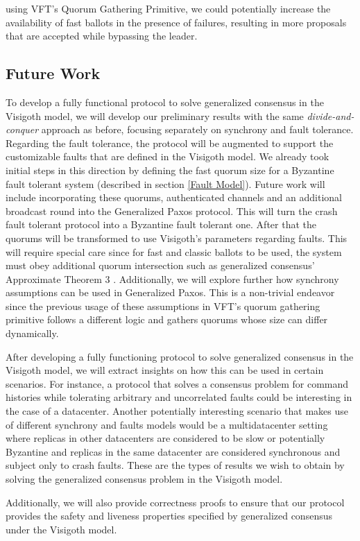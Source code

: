 \documentclass[runningheads,a4paper]{llncs}
\begin{document}
using VFT's Quorum Gathering Primitive, we could potentially increase the availability of fast ballots in the presence of failures, resulting in more proposals that are accepted while bypassing the leader. \par

\subsection{Future Work} \label{Future Work}

To develop a fully functional protocol to solve generalized consensus in the Visigoth model, we will develop our preliminary results with the same \textit{divide-and-conquer} approach as before, focusing separately on synchrony and fault tolerance. Regarding the fault tolerance, the protocol will be augmented to support the customizable faults that are defined in the Visigoth model. We already took initial steps in this direction by defining the fast quorum size for a Byzantine fault tolerant system (described in section \ref{Fault Model}). Future work will include incorporating these quorums, authenticated channels and an additional broadcast round into the Generalized Paxos protocol. This will turn the crash fault tolerant protocol into a Byzantine fault tolerant one. After that the quorums will be transformed to use Visigoth's parameters regarding faults. This will require special care since for fast and classic ballots to be used, the system must obey additional quorum intersection such as generalized consensus' Approximate Theorem 3 \cite{Lamport2005}. Additionally, we will explore further how synchrony assumptions can be used in Generalized Paxos. This is a non-trivial endeavor since the previous usage of these assumptions in VFT's quorum gathering primitive follows a different logic and gathers quorums whose size can differ dynamically. \par
After developing a fully functioning protocol to solve generalized consensus in the Visigoth model, we will extract insights on how this can be used in certain scenarios. For instance, a protocol that solves a consensus problem for command histories while tolerating arbitrary and uncorrelated faults could be interesting in the case of a datacenter. Another potentially interesting scenario that makes use of different synchrony and faults models would be a multidatacenter setting where replicas in other datacenters are considered to be slow or potentially Byzantine and replicas in the same datacenter are considered synchronous and subject only to crash faults. These are the types of results we wish to obtain by solving the generalized consensus problem in the Visigoth model.\par
Additionally, we will also provide correctness proofs to ensure that our protocol provides the safety and liveness properties specified by generalized consensus under the Visigoth model. 
\end{document}
